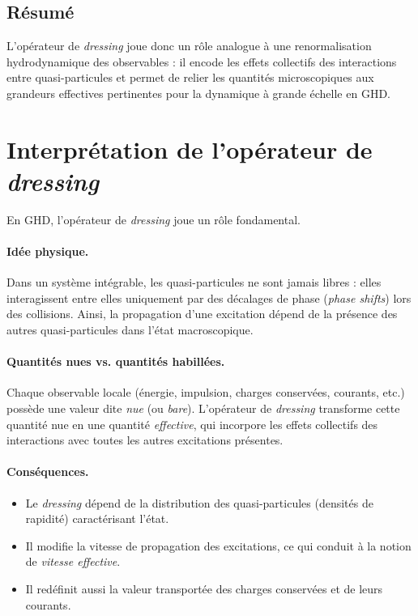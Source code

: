 \subsection*{Résumé}

L’opérateur de \textit{dressing} joue donc un rôle analogue à une
\og renormalisation hydrodynamique \fg{} des observables : il encode les effets
collectifs des interactions entre quasi-particules et permet de relier les
quantités microscopiques aux grandeurs effectives pertinentes pour la dynamique
à grande échelle en GHD.

\section*{Interprétation de l’opérateur de \textit{dressing}}

En \gls{GHD}, l’opérateur de \textit{dressing} joue un rôle fondamental.

\paragraph{Idée physique.}
Dans un système intégrable, les quasi-particules ne sont jamais libres : elles
interagissent entre elles uniquement par des décalages de phase
(\emph{phase shifts}) lors des collisions.
Ainsi, la propagation d’une excitation dépend de la présence des autres
quasi-particules dans l’état macroscopique.

\paragraph{Quantités nues vs. quantités habillées.}
Chaque observable locale (énergie, impulsion, charges conservées, courants, etc.)
possède une valeur dite \emph{nue} (ou \emph{bare}).
L’opérateur de \textit{dressing} transforme cette quantité nue en une quantité
\emph{effective}, qui incorpore les effets collectifs des interactions avec toutes
les autres excitations présentes.

\paragraph{Conséquences.}
\begin{itemize}
    \item Le \textit{dressing} dépend de la distribution des quasi-particules
    (densités de rapidité) caractérisant l’état.
    \item Il modifie la vitesse de propagation des excitations, ce qui conduit à la
    notion de \emph{vitesse effective}.
    \item Il redéfinit aussi la valeur transportée des charges conservées et de leurs
    courants.
\end{itemize}

